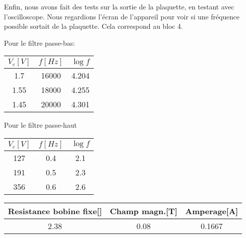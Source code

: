 Enfin, nous avons fait des tests sur la sortie de la plaquette, en testant avec l'oscilloscope.  Nous regardions l'écran de
l'appareil pour voir si une fréquence possible sortait de la plaquette.  Cela correspond au bloc 4.



Pour le filtre passe-bas:
\begin{center}
\begin{tabular}{|c|c|c|}
\hline
$V_c[V]$ & $f[Hz]$ & $\log{f}$ \\
\hline
1.7 & 16000 & 4.204 \\
\hline
1.55 & 18000 & 4.255 \\
\hline
1.45 & 20000 & 4.301 \\
\hline
\end{tabular}
\end{center}

Pour le filtre passe-haut

\begin{center}
	\begin{tabular}{|c|c|c|}
		\hline
		$V_c[V]$ & $f[Hz]$ & $\log{f}$ \\
		\hline
		127 & 0.4 & 2.1\\
		\hline
		191 & 0.5 & 2.3\\
		\hline
		356 & 0.6 & 2.6 \\
		\hline
	\end{tabular}
\end{center}

\begin{center}
	\begin{tabular}{|c|c|c|}
		\hline
		Resistance bobine fixe[\ohm] & Champ magn.[T] & Amperage[A] \\
		\hline
		2.38 & 0.08 & 0.1667\\
		\hline
	\end{tabular}
\end{center}




